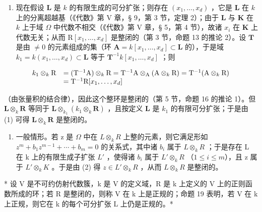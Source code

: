 \begin{enumerate}
\def\labelenumi{(\arabic{enumi})}
\setcounter{enumi}{1}
\tightlist
\item
  现在假设 \(\mathbf{L}\) 是 \(k\) 的有限生成的可分扩张；则存在 \((x_1, \ldots, x_d)\) ，它是 \(\mathbf{L}\) 在 \(k\) 上的分离超越基（《代数》第 V 章，§ 9，第 3 节，定理 2）；由于 \(\mathbf{L}\) 与 \(\mathbf{K}\) 在 \(k\) 上于域 \(\Omega\) 中代数不相交（《代数》第 V 章，§ 5，第 4 节），故诸 \(x_i\) 在 \(\mathbf{K}\) 上代数无关；从而 \(\mathrm{R}[x_1, \ldots, x_d]\) 是整闭的（第 3 节，命题 13 的推论 2）。设 \(\mathbf{T}\) 是由 \(\neq 0\) 的元素组成的集（环 \(\mathbf{A} = k[x_1, \ldots, x_d] \subset \mathbf{L}\) 的），于是域 \(k_1 = k(x_1, \ldots, x_d) \subset \mathbf{L}\) 等于 \(\mathbf{T}^{-1} k[x_1, \ldots, x_d]\) ；则
\end{enumerate}

\[
\begin{array}{r l} k _ {1} \otimes_ {k} \mathrm{R} & = (\mathrm{T} ^ {- 1} \mathrm{A}) \otimes_ {k} \mathrm{R} = \mathrm{T} ^ {- 1} \mathrm{A} \otimes_ {\mathrm{A}} (\mathrm{A} \otimes_ {k} \mathrm{R}) = \mathrm{T} ^ {- 1} (\mathrm{A} \otimes_ {k} \mathrm{R}) \\ & = \mathrm{T} ^ {- 1} \mathrm{R} [ x _ {1}, \dots , x _ {d} ] \end{array}
\]

（由张量积的结合律），因此这个整环是整闭的（第 5 节，命题 16 的推论 1）。但 \(\mathbf{L} \otimes_k \mathbf{R}\) 等同于 \(\mathbf{L} \otimes_{k_1} (k_1 \otimes_k \mathbf{R})\) ，且按定义 \(\mathbf{L}\) 是 \(k_1\) 的有限可分扩张；于是由 (1) 可得 \(\mathbf{L} \otimes_k \mathbf{R}\) 是整闭的。

\begin{enumerate}
\def\labelenumi{(\arabic{enumi})}
\setcounter{enumi}{2}
\tightlist
\item
  一般情形。若 z 是 \(\Omega\) 中在 \(L \otimes_{k} R\) 上整的元素，则它满足形如 \(z^{m} + b_{1}z^{m-1} + \cdots + b_{m} = 0\) 的关系式，其中诸 \(b_{i}\) 属于 \(L \otimes_{k} R\) ；于是存在 L 在 k 上的有限生成子扩张 \(L'\) ，使得诸 \(b_{i}\) 属于 \(L' \otimes_{k} R\) （\(1 \leqslant i \leqslant m\)），且 z 属于 \(L' \otimes_{k} K\) 。于是由 (2) 得 \(z \in L' \otimes_{k} R\) ，从而 \(L \otimes_{k} R\) 是整闭的。
\end{enumerate}

* 设 V 是不可约仿射代数簇，k 是 V 的定义域，R 是 k 上定义的 V 上的正则函数所成的环；若 R 是整闭的，则称 V 在 k 上是正规的；命题 19 表明，若 V 在 k 上正规，则它在 k 的每个可分扩张 L 上仍是正规的。*


